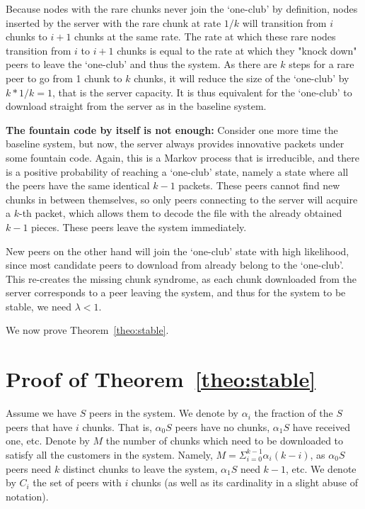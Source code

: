 \documentclass[11pt,conference]{IEEEtran}
\begin{document}
Because nodes with the rare chunks never join the `one-club' by definition, nodes inserted by the server with the rare chunk at rate $1/k$ will transition from $i$ chunks to $i+1$ chunks at the same rate. The rate at which these rare nodes transition from $i$ to $i+1$ chunks is equal to the rate at which they "knock down" peers to leave the `one-club' and thus the system. As there are $k$ steps for a rare peer to go from 1 chunk to $k$ chunks, it will reduce the size of the `one-club' by $k * 1/k = 1$, that is the server capacity. It is thus equivalent for the `one-club' to download straight from the server as in the baseline system.

{\bf The fountain code by itself is not enough:} Consider one more time the baseline system, but now, the server always provides innovative packets under some fountain code. Again, this is a Markov process that is irreducible, and there is a positive probability of reaching a `one-club' state, namely a state where all the peers have the same identical $k-1$ packets. These peers cannot find new chunks in between themselves, so only peers connecting to the server will acquire a $k$-th packet, which allows them to decode the file with the already obtained $k-1$ pieces. These peers leave the system immediately.

New peers on the other hand will join the `one-club' state with high likelihood, since most candidate peers to download from already belong to the `one-club'. This re-creates the missing chunk syndrome, as each chunk downloaded from the server corresponds to a peer leaving the system, and thus for the system to be stable, we need $\lambda < 1$.

We now prove Theorem~\ref{theo:stable}.

\section{Proof of Theorem~\ref{theo:stable}}
\label{sec:proof}

Assume we have $S$ peers in the system. We denote by $\alpha_i$ the fraction of the $S$ peers that have $i$ chunks. That is, $\alpha_0 S$ peers have no chunks, $\alpha_1 S$ have received one, etc. Denote by $M$ the number of chunks which need to be downloaded to satisfy all the customers in the system. Namely, $M = \Sigma_{i=0}^{k-1} \alpha_i (k-i)$, as $\alpha_0 S$ peers need $k$ distinct chunks to leave the system, $\alpha_1 S$ need $k-1$, etc. We denote by $C_i$ the set of peers with $i$ chunks (as well as its cardinality in a slight abuse of notation).
\end{document}
